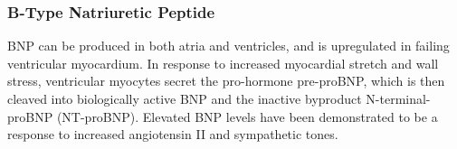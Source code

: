 \documentclass[14pt,a4paper,onecolumn]{extarticle}
\begin{document}

\subsubsection{B-Type Natriuretic Peptide}

BNP can be produced in both atria and ventricles, and is upregulated in failing ventricular myocardium. In response to increased myocardial stretch and wall stress, ventricular myocytes secret the pro-hormone pre-proBNP, which is then cleaved into biologically active BNP and the inactive byproduct N-terminal-proBNP (NT-proBNP). Elevated BNP levels have been demonstrated to be a response to increased angiotensin II and sympathetic tones. \citep{Iwanaga2006}
\end{document}
